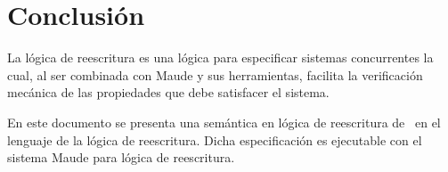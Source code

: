 
\chapter{Conclusi\'on}
\label{c.conclu}

La l\'ogica de reescritura es una l\'ogica para especificar sistemas concurrentes la cual, al ser combinada con Maude y sus herramientas, facilita la verificaci\'on mec\'anica de las propiedades que debe satisfacer el sistema.

En este documento se presenta una sem\'antica en l\'ogica de reescritura de \SCCP \ en el lenguaje de la l\'ogica de reescritura. Dicha especificaci\'on es ejecutable con el sistema Maude para l\'ogica de reescritura.




